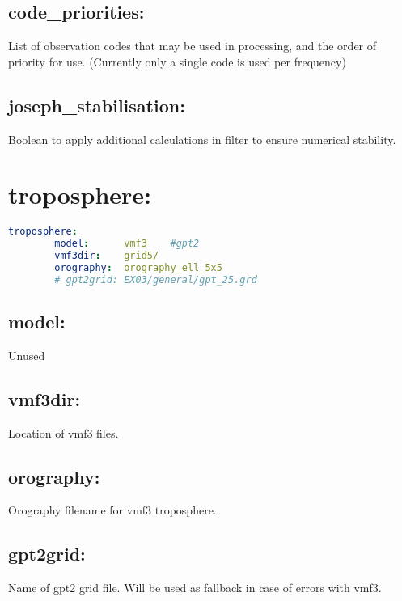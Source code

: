 \subsection*{code\_priorities:}
List of observation codes that may be used in processing, and the order of priority for use. (Currently only a single code is used per frequency)

\subsection*{joseph\_stabilisation:}
Boolean to apply additional calculations in filter to ensure numerical stability.










\section{troposphere:}


\begin{lstlisting}[language=yaml,caption=troposphere:]
    troposphere:
        model:      vmf3    #gpt2
        vmf3dir:    grid5/
        orography:  orography_ell_5x5
        # gpt2grid: EX03/general/gpt_25.grd
\end{lstlisting}
\subsection*{model:}

Unused

\subsection*{vmf3dir:}

Location of vmf3 files.

\subsection*{orography:}

Orography filename for vmf3 troposphere.

\subsection*{gpt2grid:}

Name of gpt2 grid file. Will be used as fallback in case of errors with vmf3.




